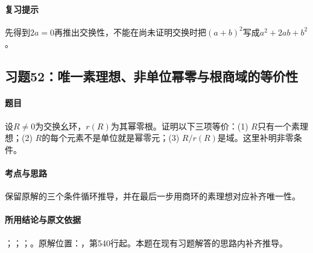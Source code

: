 \paragraph{复习提示}

先得到$2a=0$再推出交换性，不能在尚未证明交换时把$(a+b)^2$写成$a^2+2ab+b^2$。



\subsection{习题52：唯一素理想、非单位幂零与根商域的等价性}

\label{ex:3:52}

\paragraph{题目}

设$R\ne0$为交换幺环，$r(R)$为其幂零根。证明以下三项等价：(1) $R$只有一个素理想；(2) $R$的每个元素不是单位就是幂零元；(3) $R/r(R)$是域。这里补明非零条件。

\paragraph{考点与思路}

保留原解的三个条件循环推导，并在最后一步用商环的素理想对应补齐唯一性。

\paragraph{所用结论与原文依据}

；；；。原解位置：，第540行起。本题在现有习题解答的思路内补齐推导。


